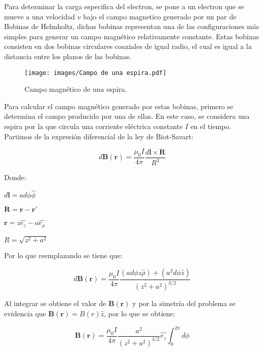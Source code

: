 Para determinar la carga especifica del electron, se pone a un electron que se mueve a una velocidad $v$ bajo el campo magnetico 
generado por un par de Bobinas de Helmholtz, dichas bobinas representan una de las configuraciones más
simples para generar un campo magnético relativamente constante. Estas bobinas consisten en dos bobinas circulares coaxiales de igual
radio, el cual es igual a la distancia entre los planos de las bobinas.



\begin{figure}[H]
    \centering
    \texttt{[image: images/Campo de una espira.pdf]}
    \caption{Campo magnético de una espira.}
    \label{fig:una_espira}
\end{figure}

Para calcular el campo magnético generado por estas bobinas, primero se determina el campo producido por una de ellas. En este caso, se considera una espira por la que circula una corriente eléctrica constante $I$ en el tiempo. Partimos de la expresión diferencial de la ley de Biot-Savart:

\begin{equation}\label{eq:Biot-Savart}
    d\mathbf{B}(\mathbf{r}) = \frac{\mu_0 I}{4 \pi} \frac{d\mathbf{l} \times \mathbf{R}}{R^{3}}
\end{equation}

Donde:

$d\mathbf{l}=a d\phi \hat{\phi}$ 

$\mathbf{R}=\mathbf{r}-\mathbf{r'}$ 

$\mathbf{r}=z\hat{e_{z}}-a\hat{e_{\rho}}$

$R=\sqrt{z^{2}+a^{2}}$ 

Por lo que reemplazando se tiene que:

\begin{equation} 
    d\mathbf{B}(\mathbf{r}) = \frac{\mu_{0}I}{4\pi} \frac{(a d\phi z \hat{\rho}) + (a^{2}d\phi \hat{z})}{(z^{2}+a^{2})^{3/2}}
\end{equation} 

Al integrar se obtiene el valor de $\mathbf{B}(\mathbf{r})$ y por la simetría del problema se evidencia que $\mathbf{B}(\mathbf{r}) = B(r)\hat{z}$, por lo que se obtiene:

\begin{equation} 
	\mathbf{B}(\mathbf{r}) = \frac{\mu_{0}I}{4 \pi} \frac{a^{2}}{(z^{2}+a^{2})^{3/2}} \hat{e_{z}} \int _{0}^{2 \pi} d\phi
\end{equation}

